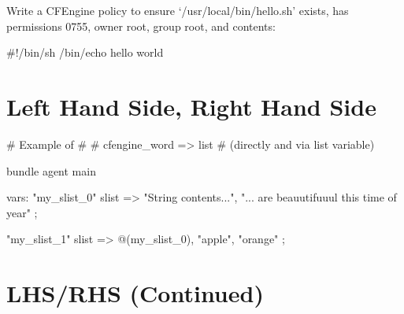 \begin{aside}
\label{aside:exercise_29}

Write a CFEngine policy to ensure `/usr/local/bin/hello.sh' exists,
has permissions 0755, owner root, group root, and contents:

\begin{code}
#!/bin/sh
/bin/echo hello world
\end{code}

\end{aside}





\section{Left Hand Side, Right Hand Side}

\begin{codelisting}
\end{codelisting}
\begin{codelisting}
\begin{code}
# Example of
#
#      cfengine_word => { list }    #  (directly and via list variable)

bundle agent main
{
  vars:
      "my_slist_0"
        slist  => {
                    "String contents...",
                    "... are beauutifuuul this time of year"
                  };

      "my_slist_1"
        slist  => { @(my_slist_0), "apple", "orange" };
}
\end{code}
\end{codelisting}





\section{LHS/RHS (Continued)}





